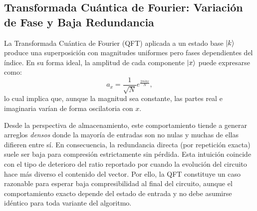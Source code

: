 \subsection{Transformada Cuántica de Fourier: Variación de Fase y Baja Redundancia}
\label{subsec:patrones_qft}

La Transformada Cuántica de Fourier (QFT) aplicada a un estado base $\ket{k}$ produce una superposición con magnitudes uniformes pero fases dependientes del índice. En su forma ideal, la amplitud de cada componente $\ket{x}$ puede expresarse como:
\[
a_x = \frac{1}{\sqrt{N}} e^{\frac{2\pi i k x}{N}},
\]
lo cual implica que, aunque la magnitud sea constante, las partes real e imaginaria varían de forma oscilatoria con $x$.

Desde la perspectiva de almacenamiento, este comportamiento tiende a generar arreglos \textit{densos} donde la mayoría de entradas son no nulas y muchas de ellas difieren entre sí. En consecuencia, la redundancia directa (por repetición exacta) suele ser baja para compresión estrictamente sin pérdida. Esta intuición coincide con el tipo de deterioro del ratio reportado por \textcite{wu2018amplitude} cuando la evolución del circuito hace más diverso el contenido del vector. Por ello, la QFT constituye un caso razonable para esperar baja compresibilidad al final del circuito, aunque el comportamiento exacto depende del estado de entrada y no debe asumirse idéntico para toda variante del algoritmo.
